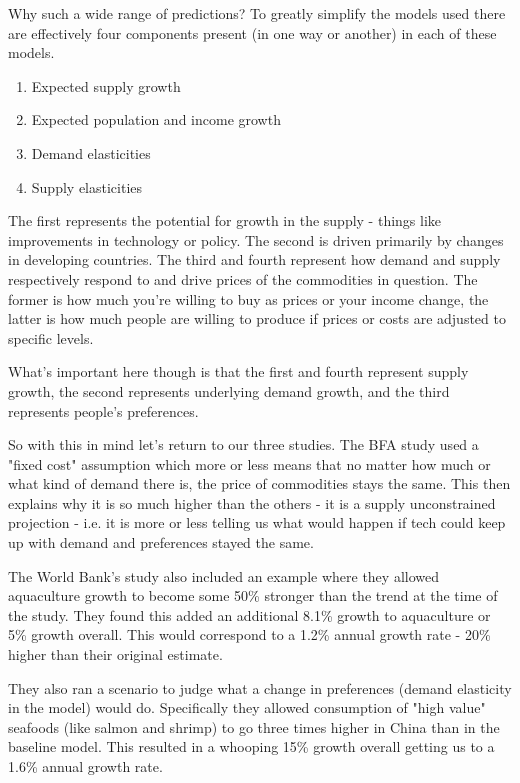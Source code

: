 \documentclass[11pt,a5paper]{book}
\begin{document}
Why such a wide range of predictions? To greatly simplify the models used there are effectively four components present (in one way or another) in each of these models. 
\begin{enumerate}
\item Expected supply growth
\item Expected population and income growth
\item Demand elasticities
\item Supply elasticities
\end{enumerate}

The first represents the potential for growth in the supply - things like improvements in technology or policy. The second is driven primarily by changes in developing countries. The third and fourth represent how demand and supply respectively respond to and drive prices of the commodities in question. The former is how much you're willing to buy as prices or your income change, the latter is how much people are willing to produce if prices or costs are adjusted to specific levels. 
\newline

What's important here though is that the first and fourth represent supply growth, the second represents underlying demand growth, and the third represents people's preferences. 
\newline

So with this in mind let's return to our three studies. The BFA study used a "fixed cost" assumption which more or less means that no matter how much or what kind of demand there is, the price of commodities stays the same. This then explains why it is so much higher than the others - it is a supply unconstrained projection - i.e. it is more or less telling us what would happen if tech could keep up with demand and preferences stayed the same. 
\newline

The World Bank's study also included an example where they allowed aquaculture growth to become some 50\% stronger than the trend at the time of the study. They found this added an additional 8.1\% growth to aquaculture or 5\% growth overall. This would correspond to a 1.2\%  annual growth rate - 20\% higher than their original estimate. 
\newline

They also ran a scenario to judge what a change in preferences (demand elasticity in the model) would do. Specifically they allowed consumption of "high value" seafoods (like salmon and shrimp) to go three times higher in China than in the baseline model. This resulted in a whooping 15\% growth overall getting us to a 1.6\% annual growth rate. 
\newline 
\end{document}
